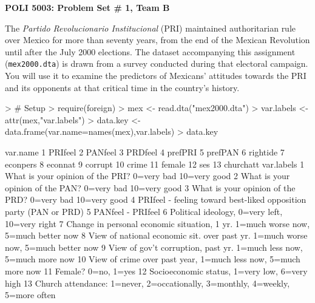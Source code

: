 \documentclass[12pt]{article}
\begin{document}


\pagestyle{empty}

\begin{center}
{\Large \textbf{POLI 5003: Problem Set \# 1, Team B}}
\end{center}

The \emph{Partido Revolucionario Institucional} (PRI) maintained authoritarian rule over Mexico for more than seventy years, from the end of the Mexican Revolution until after the July 2000 elections.  The dataset accompanying this assignment (\texttt{mex2000.dta}) is drawn from a survey conducted during that electoral campaign.  You will use it to examine the predictors of Mexicans' attitudes towards the PRI and its opponents at that critical time in the country's history. 

\begin{Schunk}
\begin{Sinput}
> # Setup
> require(foreign)
> mex <- read.dta("mex2000.dta")
> var.labels <- attr(mex,"var.labels")
> data.key <- data.frame(var.name=names(mex),var.labels)
> data.key
\end{Sinput}
\begin{Soutput}
    var.name
1    PRIfeel
2    PANfeel
3    PRDfeel
4    prefPRI
5    prefPAN
6   rightide
7   econpers
8    econnat
9    corrupt
10     crime
11    female
12       ses
13 churchatt
                                                                         var.labels
1                          What is your opinion of the PRI? 0=very bad 10=very good
2                          What is your opinion of the PAN? 0=very bad 10=very good
3                          What is your opinion of the PRD? 0=very bad 10=very good
4                 PRIfeel - feeling toward best-liked opposition party (PAN or PRD)
5                                                                 PANfeel - PRIfeel
6                                    Political ideology, 0=very left, 10=very right
7  Change in personal economic situation, 1 yr. 1=much worse now, 5=much better now
8  View of national economic sit. over past yr. 1=much worse now, 5=much better now
9               View of gov't corruption, past yr. 1=much less now, 5=much more now
10                   View of crime over past year, 1=much less now, 5=much more now
11                                                              Female? 0=no, 1=yes
12                                    Socioeconomic status, 1=very low, 6=very high
13    Church attendance: 1=never, 2=occationally, 3=monthly, 4=weekly, 5=more often
\end{Soutput}
\end{Schunk}
\end{document}
